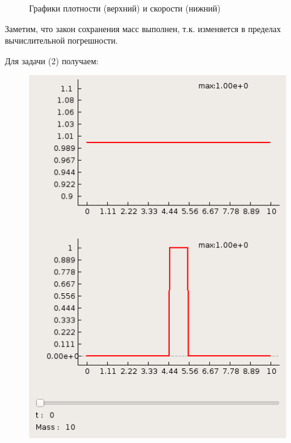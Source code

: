 \documentclass[a4paper, 11pt]{article}
\begin{document}
\begin{figure}[h]
\begin{minipage}[h] {0.49\linewidth}
	\end{minipage}
	\caption{Графики плотности (верхний) и скорости (нижний)}
\end{figure}
Заметим, что закон сохранения масс выполнен, т.к. изменяется в пределах вычислительной погрешности.

Для задачи (2) получаем:
\begin{figure}[H]
	\begin{minipage}[h] {0.49\linewidth}
		\includegraphics[width=1\linewidth]{p2/p2_t=0.png}
	\end{minipage}
	\begin{minipage}[h] {0.49\linewidth}

\end{minipage}
\end{figure}
\end{document}
